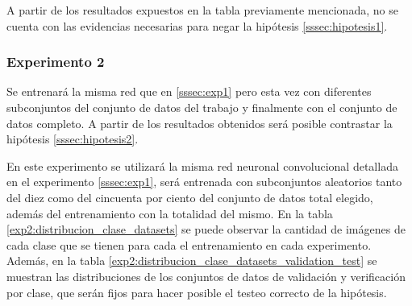 A partir de los resultados expuestos en la tabla previamente mencionada, no se cuenta con las evidencias necesarias para negar la hipótesis \ref{sssec:hipotesis1}. 

\subsubsection{Experimento 2} \label{sssec:exp2}
Se entrenará la misma red que en \ref{sssec:exp1} pero esta vez con diferentes subconjuntos del conjunto de datos del trabajo \cite{vision_based_real_estate_price_estimation} y finalmente con el conjunto de datos completo. A partir de los resultados obtenidos será posible contrastar la hipótesis \ref{sssec:hipotesis2}.

En este experimento se utilizará la misma red neuronal convolucional detallada en el experimento \ref{sssec:exp1}, será entrenada con subconjuntos aleatorios tanto del diez como del cincuenta por ciento del conjunto de datos total elegido, además del entrenamiento con la totalidad del mismo. En la tabla \ref{exp2:distribucion_clase_datasets} se puede observar la cantidad de imágenes de cada clase que se tienen para cada el entrenamiento en cada experimento. Además, en la tabla \ref{exp2:distribucion_clase_datasets_validation_test} se muestran las distribuciones de los conjuntos de datos de validación y verificación por clase, que serán fijos para hacer posible el testeo correcto de la hipótesis.

